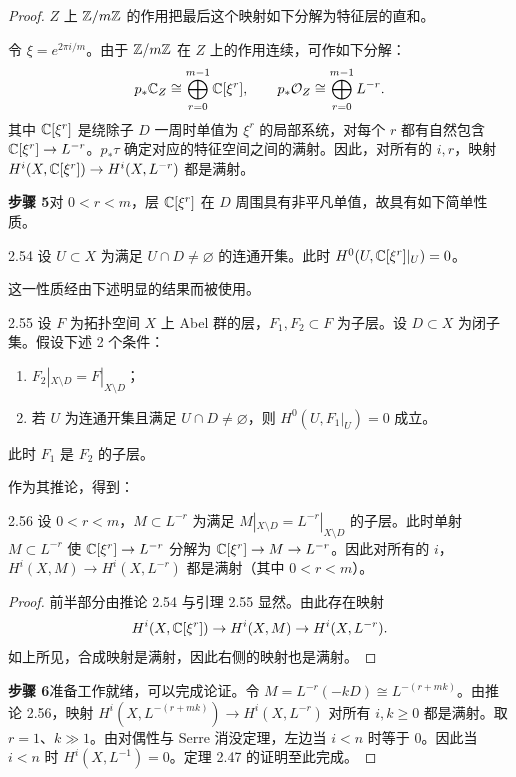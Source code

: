 \begin{proof}
$Z$ 上 $\mathbb{Z}/m\mathbb{Z}$ 的作用把最后这个映射如下分解为特征层的直和。

令 $\xi=e^{2\pi i/m}$。由于 $\mathbb{Z}/m\mathbb{Z}$ 在 $Z$ 上的作用连续，可作如下分解：
\[
p_*\mathbb{C}_Z\cong\bigoplus_{r=0}^{m-1}\mathbb{C}[\xi^r],\qquad p_*\mathcal{O}_Z\cong\bigoplus_{r=0}^{m-1}L^{-r}.
\]
其中 $\mathbb{C}[\xi^r]$ 是绕除子 $D$ 一周时单值为 $\xi^r$ 的局部系统，对每个 $r$ 都有自然包含 $\mathbb{C}[\xi^r]\to L^{-r}$。$p_*\tau$ 确定对应的特征空间之间的满射。因此，对所有的 $i,r$，映射 $H^i(X,\mathbb{C}[\xi^r])\to H^i(X,L^{-r})$ 都是满射。

\textbf{步骤 5}\quad 对 $0<r<m$，层 $\mathbb{C}[\xi^r]$ 在 $D$ 周围具有非平凡单值，故具有如下简单性质。

\begin{corollary}{2.54}
设 $U\subset X$ 为满足 $U\cap D\ne\varnothing$ 的连通开集。此时 $H^0(U,\mathbb{C}[\xi^r]|_U)=0$。
\end{corollary}

这一性质经由下述明显的结果而被使用。

\begin{lemma}{2.55}
设 $F$ 为拓扑空间 $X$ 上 Abel 群的层，$F_1,F_2\subset F$ 为子层。设 $D\subset X$ 为闭子集。假设下述 2 个条件：
\begin{enumerate}[label=（\arabic*）,leftmargin=2.8em]
\item $F_2|_{X\setminus D}=F|_{X\setminus D}$；
\item 若 $U$ 为连通开集且满足 $U\cap D\ne\varnothing$，则 $H^0(U,F_1|_U)=0$ 成立。
\end{enumerate}
此时 $F_1$ 是 $F_2$ 的子层。
\end{lemma}


作为其推论，得到：

\begin{corollaryp}{2.56}
设 $0<r<m$，$M\subset L^{-r}$ 为满足 $M|_{X\setminus D}=L^{-r}|_{X\setminus D}$ 的子层。此时单射 $M\subset L^{-r}$ 使 $\mathbb{C}[\xi^r]\to L^{-r}$ 分解为 $\mathbb{C}[\xi^r]\to M\to L^{-r}$。因此对所有的 $i$，$H^i(X,M)\to H^i(X,L^{-r})$ 都是满射（其中 $0<r<m$）。
\end{corollaryp}

\begin{proof}
前半部分由推论 2.54 与引理 2.55 显然。由此存在映射
\[
H^i(X,\mathbb{C}[\xi^r])\to H^i(X,M)\to H^i(X,L^{-r}).
\]
如上所见，合成映射是满射，因此右侧的映射也是满射。
\end{proof}

\textbf{步骤 6}\quad 准备工作就绪，可以完成论证。令 $M=L^{-r}(-kD)\cong L^{-(r+mk)}$。由推论 2.56，映射 $H^i(X,L^{-(r+mk)})\to H^i(X,L^{-r})$ 对所有 $i,k\ge 0$ 都是满射。取 $r=1$、$k\gg 1$。由对偶性与 Serre 消没定理，左边当 $i<n$ 时等于 0。因此当 $i<n$ 时 $H^i(X,L^{-1})=0$。定理 2.47 的证明至此完成。
\end{proof}

